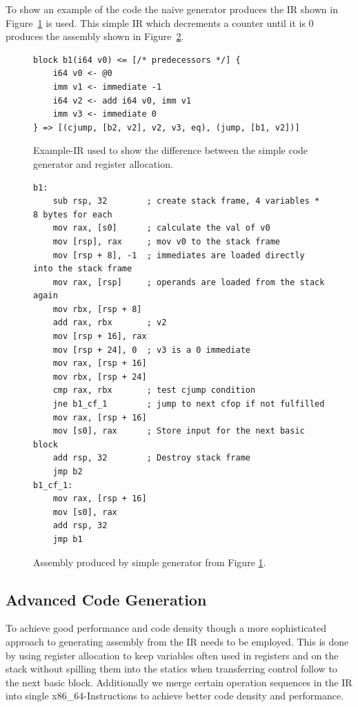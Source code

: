 \documentclass[course=eragp]{aspdoc}
\begin{document}
\par

To show an example of the code the naive generator produces the IR shown in Figure~\ref{fig:example_ir} is used.
This simple IR which decrements a counter until it is 0 produces the assembly shown in Figure~\ref{fig:naive_gen_asm}.
\begin{figure}
    \centering
    \begin{lstlisting}[]
block b1(i64 v0) <= [/* predecessors */] {
    i64 v0 <- @0
    imm v1 <- immediate -1
    i64 v2 <- add i64 v0, imm v1
    imm v3 <- immediate 0
} => [(cjump, [b2, v2], v2, v3, eq), (jump, [b1, v2])]
\end{lstlisting}
    \caption{Example-IR used to show the difference between the simple code generator and register allocation.}\label{fig:example_ir}
\end{figure}

\begin{figure}[h]
    \centering
    \begin{lstlisting}[language={[x86masm]Assembler}]
b1:
    sub rsp, 32        ; create stack frame, 4 variables * 8 bytes for each
    mov rax, [s0]      ; calculate the val of v0
    mov [rsp], rax     ; mov v0 to the stack frame
    mov [rsp + 8], -1  ; immediates are loaded directly into the stack frame
    mov rax, [rsp]     ; operands are loaded from the stack again
    mov rbx, [rsp + 8]
    add rax, rbx       ; v2
    mov [rsp + 16], rax
    mov [rsp + 24], 0  ; v3 is a 0 immediate
    mov rax, [rsp + 16]
    mov rbx, [rsp + 24]
    cmp rax, rbx       ; test cjump condition
    jne b1_cf_1        ; jump to next cfop if not fulfilled
    mov rax, [rsp + 16]
    mov [s0], rax      ; Store input for the next basic block
    add rsp, 32        ; Destroy stack frame
    jmp b2
b1_cf_1:
    mov rax, [rsp + 16]
    mov [s0], rax
    add rsp, 32
    jmp b1
\end{lstlisting}
    \caption{Assembly produced by simple generator from Figure \ref{fig:example_ir}.}\label{fig:naive_gen_asm}
\end{figure}

\subsection{Advanced Code Generation}
To achieve good performance and code density though a more sophisticated approach to generating assembly from the IR needs to be employed.
This is done by using register allocation to keep variables often used in registers and on the stack without spilling them into the statics when transferring control follow
to the next basic block. Additionally we merge certain operation sequences in the IR into single x86\_64-Instructions to achieve better code density and performance.
\end{document}
